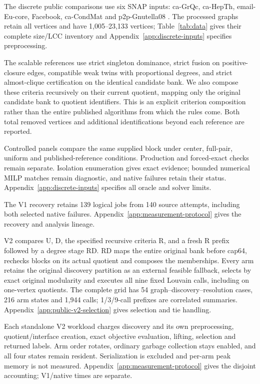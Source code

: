 \documentclass[sigconf,anonymous,review]{acmart}
\newcommand{\1}{\mathbf{1}}
\begin{document}
The discrete public comparisons use six SNAP inputs: ca-GrQc, ca-HepTh,
email-Eu-core, Facebook, ca-CondMat and p2p-Gnutella08
\cite{leskovec2014snap,leskovec2007graph,yin2017local,mcauley2012learning,ripeanu2002mapping}.
The processed graphs retain all vertices and have 1,005--23,133 vertices;
Table~\ref{tab:data} gives their complete size/LCC inventory and
Appendix~\ref{app:discrete-inputs} specifies preprocessing.

The scalable references use strict singleton dominance, strict fusion on
positive-closure edges, compatible weak twins with proportional degrees, and
strict almost-clique certification on the identical candidate bank. We also
compose these criteria recursively on their current quotient, mapping only the
original candidate bank to quotient identifiers. This is an explicit criterion
composition rather than the entire published algorithms from which the rules
come. Both total removed vertices and additional identifications beyond each
reference are reported.

Controlled panels compare the same supplied block under center, full-pair,
uniform and published-reference conditions. Production and forced-exact checks
remain separate. Isolation enumeration gives exact evidence; bounded numerical
MILP matches remain diagnostic, and native failures retain their status.
Appendix~\ref{app:discrete-inputs} specifies all oracle and solver limits.

The V1 recovery retains 139 logical jobs from 140 source attempts, including
both selected native failures. Appendix~\ref{app:measurement-protocol} gives
the recovery and analysis lineage.

V2 compares U, D, the specified recursive criteria R, and a fresh R prefix
followed by a degree stage RD. RD maps the entire original bank before cap64,
rechecks blocks on its actual quotient and composes the memberships.
Every arm retains the original discovery partition as an external feasible
fallback, selects by exact original modularity and executes all nine fixed
Louvain calls, including on one-vertex quotients. The complete grid has
54 graph--discovery--resolution cases, 216 arm states and 1,944 calls;
1/3/9-call prefixes are correlated summaries.
Appendix~\ref{app:public-v2-selection} gives selection and tie handling.

Each standalone V2 workload charges discovery and its own preprocessing,
quotient/interface creation, exact objective evaluation, lifting, selection
and returned labels. Arm order rotates, ordinary garbage collection stays
enabled, and all four states remain resident. Serialization is excluded and
per-arm peak memory is not measured. Appendix~\ref{app:measurement-protocol}
gives the disjoint accounting; V1/native times are separate.
\end{document}
